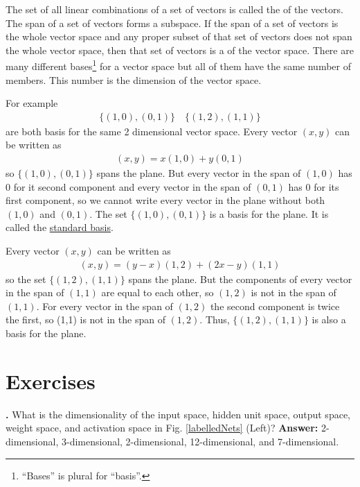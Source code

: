    The set of all linear combinations of a set of vectors is called the 
 of the vectors. The span of a set of vectors forms a 
subspace. If the span of a set of vectors is the whole vector space and any
proper subset of that set of vectors does not span the whole vector space, then 
that set of vectors is a  of the vector space. There are
many different bases\footnote{``Bases'' is plural for ``basis''.} for a vector space but 
all of them have the same number of members. This number is the dimension of 
the vector space. 

   For example
\begin{eqnarray*}
\{ (1,0), (0,1) \} \quad \{ (1,2), (1,1) \}
\end{eqnarray*}
are both basis for the same 2 dimensional vector space. Every vector $(x,y)$
can be written as
\begin{eqnarray*}
(x,y) = x(1,0)+y(0,1)
\end{eqnarray*}  
so $\{ (1,0), (0,1) \}$ spans the plane. But every vector in the span of
$(1,0)$ has $0$ for it second component and every vector in the span of $(0,1)$
has $0$ for its first component, so we cannot write every vector in the plane 
without both $(1,0)$ and $(0,1)$. The set $\{ (1,0), (0,1) \}$ is a basis for 
the plane. It is called the \underline{standard basis}. 

   Every vector $(x,y)$ can be written as
\begin{eqnarray*}
 (x,y) =(y-x)(1,2) +(2x-y)(1,1)
\end{eqnarray*}  
so the set $\{ (1,2), (1,1) \}$ spans the plane. But the components of every 
vector in the span of $(1,1)$ are equal to each other, so $(1,2)$ is not in the 
span of $(1,1)$. For every vector in the span of $(1,2)$ the second
component is twice the first, so (1,1) is not in the span of $(1,2)$. Thus, 
$\{ (1,2), (1,1) \}$ is also a basis for the plane. 

\section{Exercises}\label{linear_algebra_exercises}


\noindent
{}
{\bf \theLinearAlgebraCounter.}  What is the dimensionality of the input space, hidden unit space, output space, weight space, and activation space in Fig. \ref{labelledNets} (Left)? 
{\bf Answer:} 2-dimensional, 3-dimensional, 2-dimensional, 12-dimensional, and 7-dimensional.
\bigskip

